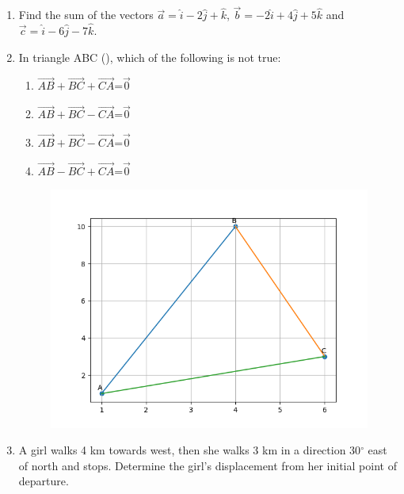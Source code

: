 \begin{enumerate}[label=\thesubsection.\arabic*,ref=\thesubsection.\theenumi]
\item Find the sum of the vectors $\vec{a}=\hat{i}-2\hat{j}+\hat{k}$, $\vec{b}=-2\hat{i}+4\hat{j}+5\hat{k}$ and $\vec{c}=\hat{i}-6\hat{j}-7\hat{k}$.
\item 

	In triangle ABC 
		(),
		which of the following is not true:
 \begin{enumerate}
         \item $\overrightarrow{AB}+\overrightarrow{BC}+\overrightarrow{CA}$=$\vec{0}$
         \item $\overrightarrow{AB}+\overrightarrow{BC}-\overrightarrow{CA}$=$\vec{0}$
         \item $\overrightarrow{AB}+\overrightarrow{BC}-\overrightarrow{CA}$=$\vec{0}$
         \item $\overrightarrow{AB}-\overrightarrow{BC}+\overrightarrow{CA}$=$\vec{0}$
\end{enumerate}
\begin{figure}[!ht]
\centering
\includegraphics[width = \columnwidth]{./chapters/12/10/2/18/figs/triangle.png}
\caption{}
	\label{fig:chapters/12/10/2/18/}
\end{figure}
\solution
		
\item A girl walks 4 km towards west, then she walks 3 km in a direction 30$^{\circ}$ east of north and stops. Determine the girl's displacement from her initial point of departure.\\

\end{enumerate}
